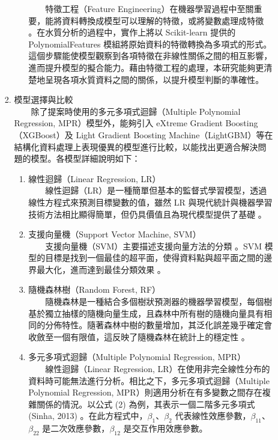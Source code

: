 \documentclass[12pt,a4paper]{article}
\begin{document}
\begin{enumerate}
\begin{enumerate}[label=\arabic*.]
\begin{enumerate}[label=2-2-\arabic*.]
\begin{enumerate}[label=\Alph*.]
                　　特徵工程（Feature Engineering）在機器學習過程中至關重要，能將資料轉換成模型可以理解的特徵，或將變數處理成特徵 \cite{ref28}。在水質分析的過程中，實作上將以 Scikit-learn 提供的 PolynomialFeatures 模組將原始資料的特徵轉換為多項式的形式。這個步驟能使模型觀察到各項特徵在非線性關係之間的相互影響，進而提升模型的擬合能力。藉由特徵工程的處理，本研究能夠更清楚地呈現各項水質資料之間的關係，以提升模型判斷的準確性。
            \end{enumerate}
        \item 模型選擇與比較\\
        　　除了提案時使用的多元多項式迴歸（Multiple Polynomial Regression, MPR）模型外，能夠引入 eXtreme Gradient Boosting（XGBoost）及 Light Gradient Boosting Machine（LightGBM）等在結構化資料處理上表現優異的模型進行比較，以能找出更適合解決問題的模型。各模型詳細說明如下：
            \begin{enumerate}[label=\Alph*.]
                \item 線性迴歸（Linear Regression, LR）\\
                　　線性迴歸（LR）是一種簡單但基本的監督式學習模型，透過線性方程式來預測目標變數的值，雖然 LR 與現代統計與機器學習技術方法相比顯得簡單，但仍具價值且為現代模型提供了基礎 \cite{ref29}。
                \item 支援向量機（Support Vector Machine, SVM）\\
                　　支援向量機（SVM）主要描述支援向量方法的分類 \cite{ref30}。SVM 模型的目標是找到一個最佳的超平面，使得資料點與超平面之間的邊界最大化，進而達到最佳分類效果 \cite{ref31}。
                \\
                \item 隨機森林樹（Random Forest, RF）\\
                　　隨機森林是一種結合多個樹狀預測器的機器學習模型，每個樹基於獨立抽樣的隨機向量生成，且森林中所有樹的隨機向量具有相同的分佈特性。隨著森林中樹的數量增加，其泛化誤差幾乎確定會收斂至一個有限值，這反映了隨機森林在統計上的穩定性 \cite{ref32}。
                \item 多元多項式迴歸（Multiple Polynomial Regression, MPR）\\
                　　線性迴歸（Linear Regression, LR）在使用非完全線性分布的資料時可能無法進行分析。相比之下，多元多項式迴歸（Multiple Polynomial Regression, MPR）則適用分析在有多變數之間存在複雜關係的情況。以公式 (2) 為例，其表示一個二階多元多項式 (Sinha, 2013) \cite{ref33}。在此方程式中，$\beta_1$、$\beta_2$ 代表線性效應參數，$\beta_{11}$、$\beta_{22}$ 是二次效應參數，$\beta_{12}$ 是交互作用效應參數。

\end{enumerate}
\end{enumerate}
\end{enumerate}
\end{enumerate}
\end{document}

